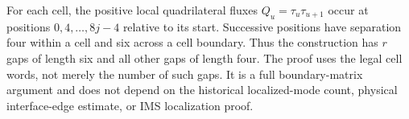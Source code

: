 For each cell, the positive local quadrilateral fluxes
$Q_u=\tau_u\tau_{u+1}$ occur at positions $0,4,\ldots,8j-4$ relative
to its start. Successive positions have separation four within a cell and
six across a cell boundary. Thus the construction has $r$ gaps of length
six and all other gaps of length four. The proof uses the legal cell
words, not merely the number of such gaps. It is a full boundary-matrix
argument and does not depend on the historical localized-mode count,
physical interface-edge estimate, or IMS localization proof.
